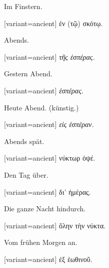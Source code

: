 Im Finstern.

\switchcolumn

\begin{greek}[variant=ancient]%
ἐν (τῷ) σκότῳ.

\end{greek}%
\switchcolumn*

Abends.

\switchcolumn

\begin{greek}[variant=ancient]%
\emph{τῆς ἑσπέρας.}

\end{greek}%
\switchcolumn*

Gestern Abend.

\switchcolumn

\begin{greek}[variant=ancient]%
\emph{ἑσπέρας.}

\end{greek}%
\switchcolumn*

Heute Abend. (künstig.)

\switchcolumn

\begin{greek}[variant=ancient]%
\emph{εἰς ἑσπέραν.}

\end{greek}%
\switchcolumn*

Abends spät.

\switchcolumn

\begin{greek}[variant=ancient]%
νύκτωρ ὀψέ.

\end{greek}%
\switchcolumn*

Den Tag über.

\switchcolumn

\begin{greek}[variant=ancient]%
δι' ἡμέρας.

\end{greek}%
\switchcolumn*

Die ganze Nacht hindurch.

\switchcolumn

\begin{greek}[variant=ancient]%
ὅλην τὴν νύκτα.

\end{greek}%
\switchcolumn*

Vom frühen Morgen an.

\switchcolumn

\begin{greek}[variant=ancient]%
ἐξ ἑωθινοῦ.

\end{greek}%
\switchcolumn*

